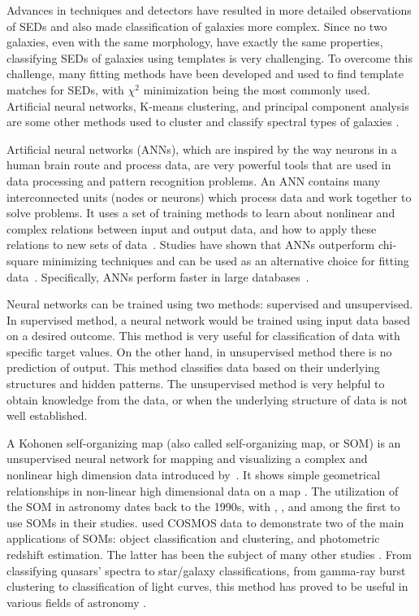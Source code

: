 Advances in techniques and detectors have resulted in more detailed observations of SEDs and also made classification of galaxies more complex.
Since no two galaxies, even with the same morphology, have exactly the same properties, classifying SEDs of galaxies using templates is very challenging.
To overcome this challenge, many fitting methods have been developed and used to find template matches for SEDs, with $\chi^2$ minimization being the most commonly used. 
Artificial neural networks, K-means clustering, and principal component analysis are some other methods used to cluster and classify spectral types of galaxies \citep[e.g.][]{Allen13,Ordov14,Shi15}.

Artificial neural networks (ANNs), which are inspired by the way neurons in a human brain route and process data, are very powerful tools that are used in data processing and pattern recognition problems.
An ANN contains many interconnected units (nodes or neurons) which process data and work together to solve problems.
It uses a set of training methods to learn about nonlinear and complex relations between input and output data, and how to apply these relations to new sets of data~\citep[e.g.][]{Hossein14,Hossein16,Ellison16a, Ellison16b}.
Studies have shown that ANNs outperform chi-square minimizing techniques and can be used as an alternative choice for fitting data~\citep[e.g.][]{Marquez91}.
Specifically, ANNs perform faster in large databases~\citep[][]{Gulati97}.

Neural networks can be trained using two methods: supervised and unsupervised.
In supervised method, a neural network would be trained using input data based on a desired outcome.
This method is very useful for classification of data with specific target values.
On the other hand, in unsupervised method there is no prediction of output.
This method classifies data based on their underlying structures and hidden patterns.
The unsupervised method is very helpful to obtain knowledge from the data, or when the underlying structure of data is not well established.

A Kohonen self-organizing map (also called self-organizing map, or SOM) is an unsupervised neural network for mapping and visualizing a complex and nonlinear high dimension data introduced by~\citet{Kohonen82}.
It shows simple geometrical relationships in non-linear high dimensional data on a map \citep{Kohonen98}.
The utilization of the SOM in astronomy dates back to the 1990s, with \citet[][]{Odewahn92}, \citet[][]{Hernandez94}, and \citet[][]{Murtagh95} among the first to use SOMs in their studies.
\citet{Geach12} used COSMOS data to demonstrate two of the main applications of SOMs: object classification and clustering, and photometric redshift estimation. The latter has been the subject of many other studies \citep[e.g.][]{Kind14a}.
From classifying quasars' spectra to star/galaxy classifications, from gamma-ray burst clustering to classification of light curves, this method has proved to be useful in various fields of astronomy \citep[e.g.][]{Maehoenen95, Miller96, Andreon00, Balastegui01, Rajaniemi02, Brett04, Scaringi09}.



